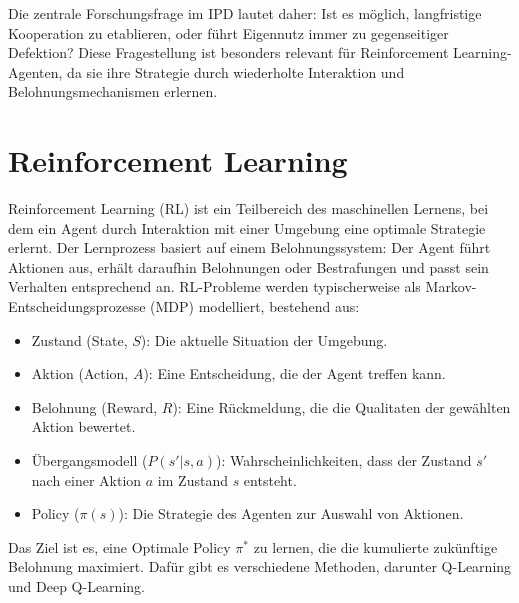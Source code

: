 Die zentrale Forschungsfrage im IPD lautet daher: Ist es möglich, langfristige 
Kooperation zu etablieren, oder führt Eigennutz immer zu gegenseitiger Defektion? 
Diese Fragestellung ist besonders relevant für Reinforcement Learning-Agenten, da 
sie ihre Strategie durch wiederholte Interaktion und Belohnungsmechanismen erlernen.

\section{Reinforcement Learning}
Reinforcement Learning (RL) ist ein Teilbereich des maschinellen Lernens, bei dem 
ein Agent durch Interaktion mit einer Umgebung eine optimale Strategie erlernt. 
Der Lernprozess basiert auf einem Belohnungssystem: Der Agent führt Aktionen aus, 
erhält daraufhin Belohnungen oder Bestrafungen und passt sein Verhalten 
entsprechend an. RL-Probleme werden typischerweise als Markov-Entscheidungsprozesse 
(MDP) modelliert, bestehend aus:
\begin{itemize}
    \item Zustand (State, $S$): Die aktuelle Situation der Umgebung.
    \item Aktion (Action, $A$): Eine Entscheidung, die der Agent treffen kann.
    \item Belohnung (Reward, $R$): Eine Rückmeldung, die die Qualitaten der gewählten Aktion bewertet.
    \item Übergangsmodell ($P(s' \vert s, a)$): Wahrscheinlichkeiten, dass der Zustand $s'$ nach einer Aktion $a$ im Zustand $s$ entsteht.
    \item Policy ($\pi(s)$): Die Strategie des Agenten zur Auswahl von Aktionen.
\end{itemize}
Das Ziel ist es, eine Optimale Policy $\pi^*$ zu lernen, die die kumulierte zukünftige Belohnung maximiert. 
Dafür gibt es verschiedene Methoden, darunter Q-Learning und Deep Q-Learning.

